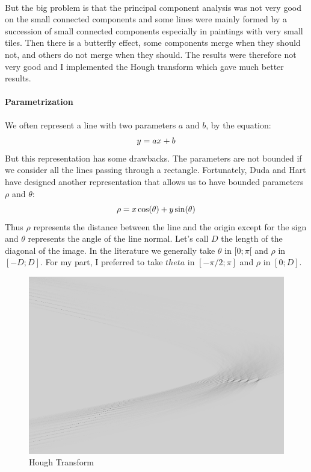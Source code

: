 \documentclass[11pt]{article}
\begin{document}
	\paragraph{}
	But the big problem is that the principal component analysis was not very good on the small connected components and some lines were mainly formed by a succession of small connected components especially in paintings with very small tiles. Then there is a butterfly effect, some components merge when they should not, and others do not merge when they should. The results were therefore not very good and I implemented the Hough transform \cite{hough} which gave much better results.
	
	\paragraph{Parametrization}
	We often represent a line with two parameters $a$ and $b$, by the equation:
	\vspace{-2.2mm} $$ y = ax + b \vspace{-2.2mm} $$ 
	But this representation has some drawbacks. The parameters are not bounded if we consider all the lines passing through a rectangle. Fortunately, Duda and Hart have designed another representation that allows us to have bounded parameters $\rho$ and $\theta$:
	\vspace{-2.2mm} $$ \rho = x \cos(\theta) + y \sin(\theta) \vspace{-2.2mm} $$
	Thus $\rho$ represents the distance between the line and the origin except for the sign and $\theta$ represents the angle of the line normal. Let's call $D$ the length of the diagonal of the image. In the literature we generally take $\theta$ in $[0; \pi[$ and $\rho$ in $[-D; D]$. For my part, I preferred to take $theta$ in $[-\pi / 2; \pi]$ and $\rho$ in $[0; D]$.
	
	
	\begin{figure}[h]
		\centering
		\includegraphics[scale=1.2]{hough_painting.png}
		\caption{Hough Transform}
	\end{figure}
\end{document}
